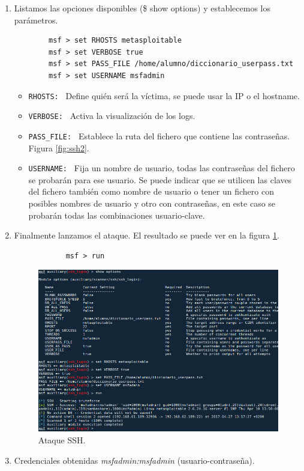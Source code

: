 \documentclass[a4,12pt,onecolum]{article}
\begin{document}
\begin{enumerate}
	\item Listamos las opciones disponibles (\$ show options) y establecemos los parámetros.
	\begin{verbatim}
		msf > set RHOSTS metasploitable
		msf > set VERBOSE true
		msf > set PASS_FILE /home/alumno/diccionario_userpass.txt
		msf > set USERNAME msfadmin
	\end{verbatim}
	\begin{itemize}
		\item \texttt{RHOSTS: } Define quién será la víctima, se puede usar la IP o el hostname.
		\item \texttt{VERBOSE: } Activa la visualización de los logs.
		\item \texttt{PASS\_FILE: } Establece la ruta del fichero que contiene las contraseñas. Figura \ref{fig:ssh2}.
		\item  \texttt{USERNAME: } Fija un nombre de usuario, todas las contraseñas del fichero se probarán para ese usuario. Se puede indicar que se utilicen las claves del fichero también como nombre de usuario o tener un fichero con posibles nombres de usuario y otro con contraseñas, en este caso se probarán todas las combinaciones usuario-clave.
	\end{itemize}
	
	\item Finalmente lanzamos el ataque. El resultado se puede ver en la figura \ref{fig:ssh3}.
		\begin{verbatim}
			msf > run
		\end{verbatim}
\begin{figure}[htbp]
\centering
\includegraphics[width=1\textwidth]{./images/ssh/ssh_fuerza_bruta.png}
\caption{Ataque SSH.}
\label{fig:ssh3}
\end{figure} 

	\item Credenciales obtenidas \emph{msfadmin:msfadmin} (usuario-contraseña).

\end{enumerate}
\end{document}
